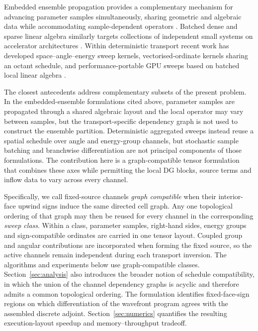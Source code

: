 \documentclass[final]{amsart}
\begin{document}
Embedded ensemble propagation provides a complementary mechanism for
advancing parameter samples simultaneously, sharing geometric and
algebraic data while accommodating sample-dependent operators
\cite{PhippsEtAl2017EmbeddedEnsemble, DEliaEtAl2018EnsembleGrouping,
  LiegeoisEtAl2020EnsembleGMRES}. Batched dense and sparse linear
algebra similarly targets collections of independent small systems on
accelerator architectures
\cite{HaidarEtAl2015BatchedGPU,AbdelfattahEtAl2016BatchedGEMM,
  LiegeoisEtAl2023BatchedSparse}. Within deterministic transport
recent work has developed space--angle--energy sweep kernels,
vectorised-ordinate kernels sharing an octant schedule, and
performance-portable GPU sweeps based on batched local linear algebra
\cite{SuauEtAl2024SharedMemory,SuauEtAl2025Vectorized,
  SuauEtAl2025Batched}.

The closest antecedents address complementary subsets of the present
problem. In the embedded-ensemble formulations cited above, parameter
samples are propagated through a shared algebraic layout and the local
operator may vary between samples, but the transport-specific
dependency graph is not used to construct the ensemble partition.
Deterministic aggregated sweeps instead reuse a spatial schedule over
angle and energy-group channels, but stochastic sample batching and
branchwise differentiation are not principal components of those
formulations. The contribution here is a graph-compatible tensor
formulation that combines these axes while permitting the local DG
blocks, source terms and inflow data to vary across every channel.

Specifically, we call fixed-source channels \emph{graph compatible}
when their interior-face upwind signs induce the same directed cell
graph. Any one topological ordering of that graph may then be reused
for every channel in the corresponding \emph{sweep class}. Within a
class, parameter samples, right-hand sides, energy groups and
sign-compatible ordinates are carried in one tensor layout. Coupled
group and angular contributions are incorporated when forming the
fixed source, so the active channels remain independent during each
transport inversion. The algorithms and experiments below use
graph-compatible classes.  Section~\ref{sec:analysis} also introduces
the broader notion of schedule compatibility, in which the union of
the channel dependency graphs is acyclic and therefore admits a common
topological ordering.  The formulation identifies fixed-face-sign
regions on which differentiation of the wavefront program agrees with
the assembled discrete adjoint. Section~\ref{sec:numerics} quantifies
the resulting execution-layout speedup and memory--throughput
tradeoff.
\end{document}
